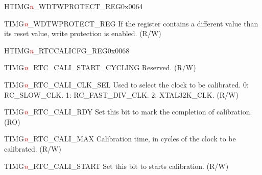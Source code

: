 \begin{register}{H}{TIMG\textcolor{red}{\it{n}}\_WDTWPROTECT\_REG}{0x0064}\label{regdesc:TIMERSWDTWPROTECTREG}
%
\regnewline%
\begin{regdesc}\begin{reglist}
\item [TIMG\textcolor{red}{\it{n}}\_WDTWPROTECT\_REG]If the register contains a different value than its reset value, write protection is enabled. (R/W)
\end{reglist}\end{regdesc}
\end{register}

\begin{register}{H}{TIMG\textcolor{red}{\it{n}}\_RTCCALICFG\_REG}{0x0068}\label{regdesc:TIMGRTCCALICFGREG}
%
%
%
%
%
%
\regnewline%
\begin{regdesc}\begin{reglist}
\label{fielddesc:TIMGRTCCALISTARTCYCLING}\item [TIMG\textcolor{red}{\it{n}}\_RTC\_CALI\_START\_CYCLING] Reserved. (R/W)
\label{fielddesc:TIMGRTCCALICLKSEL}\item [TIMG\textcolor{red}{\it{n}}\_RTC\_CALI\_CLK\_SEL] Used to select the clock to be calibrated. 0: RC\_SLOW\_CLK. 1: RC\_FAST\_DIV\_CLK. 2: XTAL32K\_CLK. (R/W)
\label{fielddesc:TIMGRTCCALIRDY}\item [TIMG\textcolor{red}{\it{n}}\_RTC\_CALI\_RDY] Set this bit to mark the completion of calibration. (RO)
\label{fielddesc:TIMGRTCCALIMAX}\item [TIMG\textcolor{red}{\it{n}}\_RTC\_CALI\_MAX] Calibration time, in cycles of the clock to be calibrated. (R/W)
\label{fielddesc:TIMGRTCCALISTART}\item [TIMG\textcolor{red}{\it{n}}\_RTC\_CALI\_START] Set this bit to starts calibration. (R/W)
\end{reglist}\end{regdesc}
\end{register}


